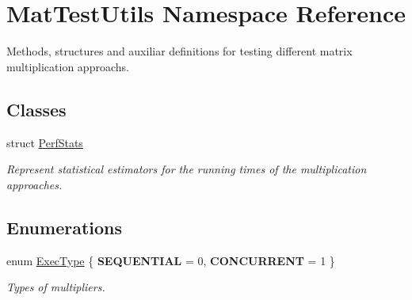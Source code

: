 \hypertarget{namespaceMatTestUtils}{}\section{Mat\+Test\+Utils Namespace Reference}
\label{namespaceMatTestUtils}


Methods, structures and auxiliar definitions for testing different matrix multiplication approachs.  


\subsection*{Classes}
\begin{DoxyCompactItemize}
\item 
struct \mbox{\hyperlink{structMatTestUtils_1_1PerfStats}{Perf\+Stats}}
\begin{DoxyCompactList}\small\item\em Represent statistical estimators for the running times of the multiplication approaches. \end{DoxyCompactList}\end{DoxyCompactItemize}
\subsection*{Enumerations}
\begin{DoxyCompactItemize}
\item 
enum \mbox{\hyperlink{namespaceMatTestUtils_a8ce892071d861e65dd62ef377efaaa6b}{Exec\+Type}} \{ {\bfseries S\+E\+Q\+U\+E\+N\+T\+I\+AL} = 0, 
{\bfseries C\+O\+N\+C\+U\+R\+R\+E\+NT} = 1
 \}
\begin{DoxyCompactList}\small\item\em Types of multipliers. \end{DoxyCompactList}\end{DoxyCompactItemize}
